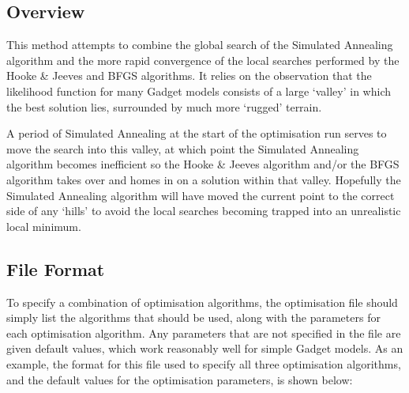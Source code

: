 \documentclass[]{book}
\begin{document}
\hypertarget{subsec:combineover}{%
\subsection{Overview}\label{subsec:combineover}}

This method attempts to combine the global search of the Simulated
Annealing algorithm and the more rapid convergence of the local searches
performed by the Hooke \& Jeeves and BFGS algorithms. It relies on the
observation that the likelihood function for many Gadget models consists
of a large `valley' in which the best solution lies, surrounded by much
more `rugged' terrain.

A period of Simulated Annealing at the start of the optimisation run
serves to move the search into this valley, at which point the Simulated
Annealing algorithm becomes inefficient so the Hooke \& Jeeves algorithm
and/or the BFGS algorithm takes over and homes in on a solution within
that valley. Hopefully the Simulated Annealing algorithm will have moved
the current point to the correct side of any `hills' to avoid the local
searches becoming trapped into an unrealistic local minimum.

\hypertarget{subsec:combinefile}{%
\subsection{File Format}\label{subsec:combinefile}}

To specify a combination of optimisation algorithms, the optimisation
file should simply list the algorithms that should be used, along with
the parameters for each optimisation algorithm. Any parameters that are
not specified in the file are given default values, which work
reasonably well for simple Gadget models. As an example, the format for
this file used to specify all three optimisation algorithms, and the
default values for the optimisation parameters, is shown below:
\end{document}
